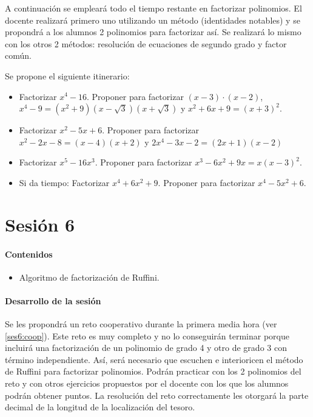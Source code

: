 A continuación se empleará todo el tiempo restante en factorizar polinomios.
%
El docente realizará primero uno utilizando un método (identidades notables) y se propondrá a los alumnos 2 polinomios para factorizar así.
%
Se realizará lo mismo con los otros 2 métodos: resolución de ecuaciones de segundo grado y factor común.

Se propone el siguiente itinerario:

\begin{itemize}
	\item Factorizar $x^4-16$. Proponer para factorizar $(x-3)·(x-2)$,$x^4-9 = (x^2+9)(x-\sqrt{3})(x+\sqrt{3})$ y $x^2+6x+9 = (x+3)^2$.
	
	\item Factorizar $x^2-5x+6$. Proponer para factorizar $x^2-2x-8 = (x-4)(x+2)$ y $2x^4-3x-2 = (2x+1)(x-2)$
	\item Factorizar $x^5-16x^3$. Proponer para factorizar $x^3-6x^2+9x = x(x-3)^2$.
	\item Si da tiempo: Factorizar $x^4+6x^2+9$. Proponer para factorizar $x^4-5x^2+6$.
\end{itemize}





\section{Sesión 6}

\paragraph{Contenidos}
\begin{itemize}
	\item Algoritmo de factorización de Ruffini.
\end{itemize}

\paragraph{Desarrollo de la sesión}

Se les propondrá un reto cooperativo durante la primera media hora (ver \ref{ses6:coop}).
%
Este reto es muy completo y no lo conseguirán terminar porque incluirá una factorización de un polinomio de grado 4 y otro de grado 3 con término independiente.
%
Así, será necesario que escuchen e interioricen el método de Ruffini para factorizar polinomios.
%
Podrán practicar con los 2 polinomios del reto y con otros ejercicios propuestos por el docente con los que los alumnos podrán obtener puntos.
%
La resolución del reto correctamente les otorgará la parte decimal de la longitud de la localización del tesoro.

